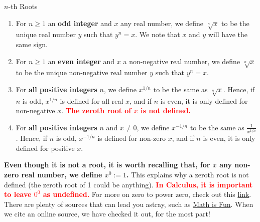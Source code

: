 \begin{tcolorbox}[colback=mylightblue,title = {Defining Roots in a Careful Manner and the Notation $x^{1/n}$}, breakable]

\begin{definition} $n$-th Roots

    \begin{enumerate}
\renewcommand{\labelenumi}{(\alph{enumi})}
\setlength{\itemsep}{.2cm}

\item For $n\ge 1$ an \textbf{odd integer} and $x$ any real number, we define $\sqrt[n]{x}$ to be the unique real number $y$ such that $y^n = x$. We note that $x$ and $y$ will have the same sign.

\item For $n\ge 1$ an \textbf{even integer} and $x$ a non-negative real number, we define $\sqrt[n]{x}$ to be the unique non-negative real number $y$ such that $y^n = x$.

\item For \textbf{all positive integers} $n$, we define $x^{1/n}$ to be the same as $\sqrt[n]{x}$. Hence, if $n$ is odd, $x^{1/n}$ is defined for all real $x$, and if $n$ is even, it is only defined for non-negative $x$.  \textcolor{red}{\bf The zeroth root of $x$ is not defined.} 

\item For \textbf{all positive integers} $n$ and $x\neq 0$, we define $x^{-1/n}$ to be the same as $\frac{1}{x^{1/n}}$. Hence, if $n$ is odd, $x^{-1/n}$ is defined for non-zero $x$, and if $n$ is even, it is only defined for positive $x$. 

\end{enumerate}
\end{definition}

\textbf{Even though it is not a root, it is worth recalling that, for $x$ any non-zero real number, we define $x^0:=1$.} This explains why a zeroth root is not defined (the zeroth root of 1 could be anything).  \textcolor{red}{\bf In Calculus, it is important to leave $0^0$ as undefined.} For more on zero to power zero, check out this \href{https://en.wikipedia.org/wiki/Zero_to_the_power_of_zero}{link}. There are plenty of sources that can lead you astray, such as \href{https://medium.com/@nhudinhtuan/math-is-fun-what-is-zero-to-the-power-of-zero-c42347c744a1}{Math is Fun}. When we cite an online source, we have checked it out, for the most part! 
\end{tcolorbox}

